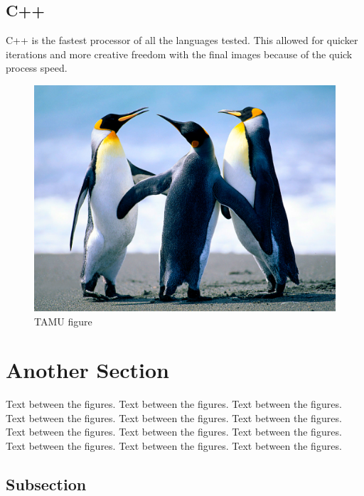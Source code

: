 \subsection{C++}
C++ is the fastest processor of all the languages tested.  This allowed for quicker iterations and more creative freedom with the final images because of the quick process speed.  
\begin{figure}[H]
\centering
\includegraphics[scale=.50]{figures/Penguins.jpg}
\caption{TAMU figure}
\label{fig:tamu-fig3}
\end{figure}
\section{Another Section}

Text between the figures.  Text between the figures. Text between the figures. Text between the figures.  Text between the figures. Text between the figures. Text between the figures.  Text between the figures. Text between the figures. Text between the figures.  Text between the figures. Text between the figures.

\subsection{Subsection}

